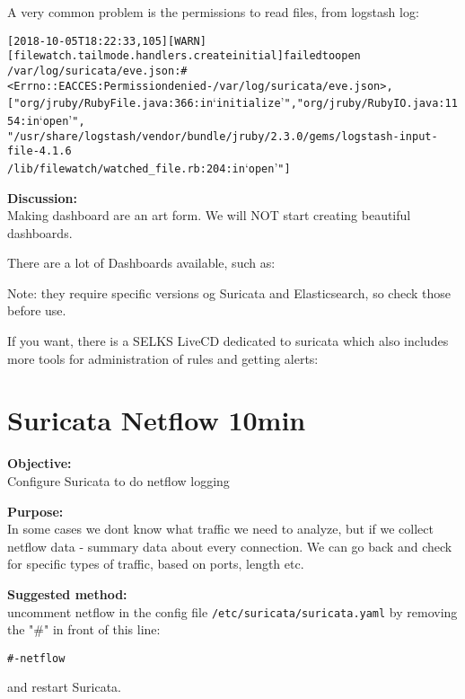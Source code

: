 \documentclass[a4paper,11pt,notitlepage]{report}
\begin{document}
A very common problem is the permissions to read files, from logstash log:
\begin{alltt}\small
[2018-10-05T18:22:33,105][WARN ][filewatch.tailmode.handlers.createinitial] failed to open
/var/log/suricata/eve.json: #<Errno::EACCES: Permission denied - /var/log/suricata/eve.json>,
["org/jruby/RubyFile.java:366:in `initialize'", "org/jruby/RubyIO.java:1154:in `open'",
 "/usr/share/logstash/vendor/bundle/jruby/2.3.0/gems/logstash-input-file-4.1.6
 /lib/filewatch/watched_file.rb:204:in `open'"]
\end{alltt}

{\bf Discussion:}\\
Making dashboard are an art form. We will NOT start creating beautiful dashboards.

There are a lot of Dashboards available, such as:\\

Note: they require specific versions og Suricata and Elasticsearch, so check those before use.

If you want, there is a SELKS LiveCD dedicated to suricata which also includes more tools for administration of rules and getting alerts:\\

\chapter{Suricata Netflow 10min}
\label{ex:suricatanetflow}


{\bf Objective:} \\
Configure Suricata to do netflow logging


{\bf Purpose:}\\
In some cases we dont know what traffic we need to analyze, but if we collect netflow data - summary data about every connection. We can go back and check for specific types of traffic, based on ports, length etc.


{\bf Suggested method:}\\

uncomment netflow in the config file \verb+/etc/suricata/suricata.yaml+
by removing the "\#" in front of this line:

\begin{alltt}
#- netflow
\end{alltt}

and restart Suricata.
\end{document}
